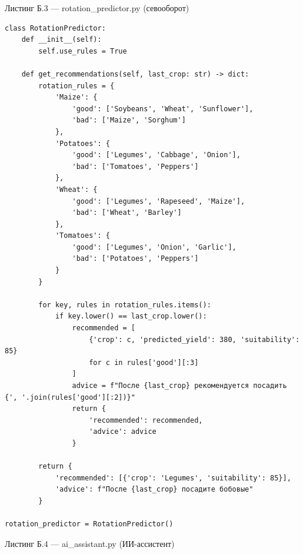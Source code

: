 \documentclass[14pt, a4paper]{extarticle}
\begin{document}
\newpage


Листинг Б.3 — rotation_predictor.py (севооборот)

\begin{verbatim}
class RotationPredictor:
    def __init__(self):
        self.use_rules = True
    
    def get_recommendations(self, last_crop: str) -> dict:
        rotation_rules = {
            'Maize': {
                'good': ['Soybeans', 'Wheat', 'Sunflower'],
                'bad': ['Maize', 'Sorghum']
            },
            'Potatoes': {
                'good': ['Legumes', 'Cabbage', 'Onion'],
                'bad': ['Tomatoes', 'Peppers']
            },
            'Wheat': {
                'good': ['Legumes', 'Rapeseed', 'Maize'],
                'bad': ['Wheat', 'Barley']
            },
            'Tomatoes': {
                'good': ['Legumes', 'Onion', 'Garlic'],
                'bad': ['Potatoes', 'Peppers']
            }
        }
        
        for key, rules in rotation_rules.items():
            if key.lower() == last_crop.lower():
                recommended = [
                    {'crop': c, 'predicted_yield': 380, 'suitability': 85} 
                    for c in rules['good'][:3]
                ]
                advice = f"После {last_crop} рекомендуется посадить {', '.join(rules['good'][:2])}"
                return {
                    'recommended': recommended,
                    'advice': advice
                }
        
        return {
            'recommended': [{'crop': 'Legumes', 'suitability': 85}],
            'advice': f"После {last_crop} посадите бобовые"
        }

rotation_predictor = RotationPredictor()
\end{verbatim}

\newpage


Листинг Б.4 — ai_assistant.py (ИИ-ассистент)
\end{document}
